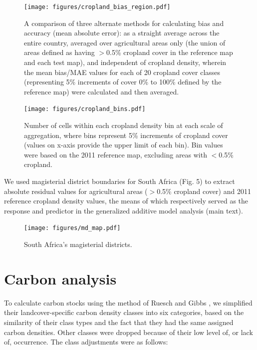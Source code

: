 \documentclass[11pt, titlepage]{article}
\begin{document}
\begin{figure}[!ht]
  \centering
     \texttt{[image: figures/cropland\_bias\_region.pdf]} 
      \caption{A comparison of three alternate methods for calculating bias and accuracy (mean absolute error): as a straight average across the entire country, averaged over agricultural areas only (the union of areas defined as having $>$0.5\% cropland cover in the reference map and each test map), and independent of cropland density, wherein the mean bias/MAE values for each of 20 cropland cover classes (representing 5\% increments of cover 0\% to 100\% defined by the reference map) were calculated and then averaged.}
      \label{fig:default}
\end{figure}

%
%

\begin{figure}[!ht]
  \centering
     \texttt{[image: figures/cropland\_bins.pdf]} 
      \caption{Number of cells within each cropland density bin at each scale of aggregation, where bins represent 5\% increments of cropland cover (values on x-axis provide the upper limit of each bin). Bin values were based on the 2011 reference map, excluding areas with $<$0.5\% cropland.}
      \label{fig:default}
\end{figure}

We used magisterial district boundaries for South Africa (Fig. 5) to extract absolute residual values for agricultural areas ($>$0.5\% cropland cover) and 2011 reference cropland density values, the means of which respectively served as the response and predictor in the generalized additive model \cite{wood_mgcv:_2001} analysis (main text). 


\begin{figure}[!ht]
  \centering
     \texttt{[image: figures/md\_map.pdf]} 
      \caption{South Africa's magisterial districts.}
      \label{fig:default}
\end{figure}

\clearpage
\section{\large Carbon analysis}

To calculate carbon stocks using the method of Ruesch and Gibbs \cite{ruesch_new_2008}, we simplified their landcover-specific carbon density classes into six categories, based on the similarity of their class types and the fact that they had the same assigned carbon densities. Other classes were dropped because of their low level of, or lack of, occurrence. The class adjustments were as follows:
\end{document}
